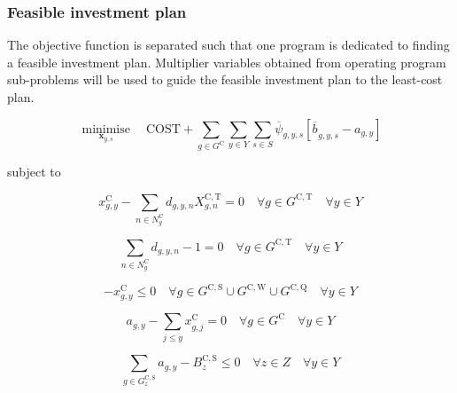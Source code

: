 \documentclass{article}
\newcommand{\sGeneratorsCandidate}{G^{\mathrm{C}}}
\newcommand{\sGeneratorsCandidateThermal}{G^{\mathrm{C,T}}}
\newcommand{\sGeneratorsCandidateWind}{G^{\mathrm{C,W}}}
\newcommand{\sGeneratorsCandidateSolar}{G^{\mathrm{C,S}}}
\newcommand{\sStorageCandidate}{G^{\mathrm{C,Q}}}
\newcommand{\sYears}{Y}
\newcommand{\sScenarios}{S}
\newcommand{\sZones}{Z}
\newcommand{\sInvestmentSizeOptions}{N^{\mathrm{C}}}
\newcommand{\sInvestmentSizeOptionsGenerator}[1][\iGenerator]{\sInvestmentSizeOptions_{#1}}
\newcommand{\iGenerator}{g}
\newcommand{\iYear}{y}
\newcommand{\iYearAlias}{j}
\newcommand{\iScenario}{s}
\newcommand{\iZone}{z}
\newcommand{\iInvestmentSizeOption}{n}
\newcommand{\cInvestmentSize}{X^{\mathrm{C,T}}_{\iGenerator,\iInvestmentSizeOption}}
\newcommand{\cBuildLimit}[1][]{B^{\mathrm{C,#1}}_{\iZone}}
\newcommand{\cObjectiveFunction}{\mathrm{COST}}
\newcommand{\vInstalledCapacity}[1][\iGenerator,\iYear]{x^{\mathrm{C}}_{#1}}
\newcommand{\vInvestmentSizeIndicator}[1][\iGenerator,\iYear,\iInvestmentSizeOption]{d_{#1}}
\newcommand{\vInstalledCapacityTotal}[1][\iGenerator,\iYear]{a_{#1}}
\newcommand{\vInstalledCapacityTotalScenario}[1][\iGenerator,\iYear,\iScenario]{b_{#1}}
\DeclareMathOperator*{\minimise}{minimise}
\begin{document}
\subsubsection{Feasible investment plan}
The objective function is separated such that one program is dedicated to finding a feasible investment plan. Multiplier variables obtained from operating program sub-problems will be used to guide the feasible investment plan to the least-cost plan.

\begin{equation}
\minimise\limits_{\bm{x}_{\iYear,\iScenario}} \quad \cObjectiveFunction + \sum\limits_{\iGenerator \in \sGeneratorsCandidate}\sum\limits_{\iYear \in \sYears}\sum\limits_{\iScenario \in \sScenarios} \overline{\psi}_{\iGenerator,\iYear,\iScenario}\left[\overline{\vInstalledCapacityTotalScenario[]}_{\iGenerator,\iYear,\iScenario} - \vInstalledCapacityTotal\right]
\end{equation}

subject to

\begin{equation}
\vInstalledCapacity - \sum\limits_{\iInvestmentSizeOption \in \sInvestmentSizeOptionsGenerator} \vInvestmentSizeIndicator \cInvestmentSize = 0 \quad \forall \iGenerator \in \sGeneratorsCandidateThermal \quad \forall \iYear \in \sYears 
\end{equation}

\begin{equation}
\sum\limits_{\iInvestmentSizeOption \in \sInvestmentSizeOptionsGenerator} \vInvestmentSizeIndicator - 1 = 0 \quad \forall \iGenerator \in \sGeneratorsCandidateThermal \quad \forall \iYear \in \sYears
\end{equation}

\begin{equation}
- \vInstalledCapacity[\iGenerator,\iYear] \leq 0 \quad \forall \iGenerator \in \sGeneratorsCandidateSolar \cup \sGeneratorsCandidateWind \cup \sStorageCandidate \quad \forall \iYear \in \sYears
\end{equation}

\begin{equation}
\vInstalledCapacityTotal - \sum\limits_{\iYearAlias \leq \iYear} \vInstalledCapacity[\iGenerator,\iYearAlias] = 0 \quad \forall \iGenerator \in \sGeneratorsCandidate \quad \forall \iYear \in \sYears
\end{equation}

\begin{equation}
\sum\limits_{\iGenerator \in \sGeneratorsCandidateSolar_{\iZone}} \vInstalledCapacityTotal - \cBuildLimit[S] \leq 0 \quad \forall \iZone \in \sZones \quad \forall \iYear \in \sYears
\end{equation}
\end{document}
